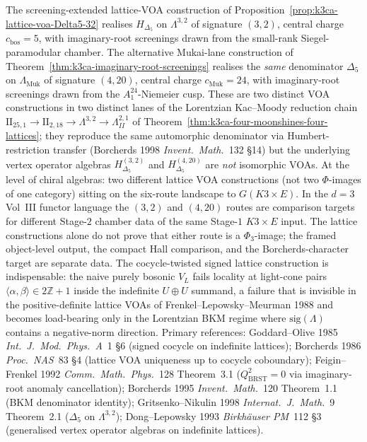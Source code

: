 \begin{remark}[Two lattice routes to \texorpdfstring{$\Delta_5$}{Delta-5}, neither subsumable; \texorpdfstring{$\Phi$}{Phi} at \texorpdfstring{$d=3$}{d=3}]
\label{rmk:k3ca-two-lattice-routes-Delta5}
The screening-extended lattice-VOA construction of
Proposition~\ref{prop:k3ca-lattice-voa-Delta5-32} realises
$H_{\Delta_5}$ on $\Lambda^{3,2}$ of signature $(3,2)$, central
charge $c_{\mathrm{bos}} = 5$, with imaginary-root screenings
drawn from the small-rank Siegel-paramodular chamber. The
alternative Mukai-lane construction of
Theorem~\ref{thm:k3ca-imaginary-root-screenings} realises the
\emph{same} denominator $\Delta_5$ on $\Lambda_{\mathrm{Muk}}$ of
signature $(4,20)$, central charge $c_{\mathrm{Muk}} = 24$, with
imaginary-root screenings drawn from the $A_1^{24}$-Niemeier cusp.
These are two distinct VOA constructions in two distinct lanes
of the Lorentzian Kac--Moody reduction chain
$\mathrm{II}_{25,1}\to\mathrm{II}_{2,18}\to\Lambda^{3,2}\to\Lambda^{2,1}_{II}$
of Theorem~\ref{thm:k3ca-four-moonshines-four-lattices}; they
reproduce the same automorphic denominator via Humbert-restriction
transfer (Borcherds 1998 \emph{Invent.\ Math.}~132 \S14) but the
underlying vertex operator algebras $H_{\Delta_5}^{(3,2)}$ and
$H_{\Delta_5}^{(4,20)}$ are \emph{not} isomorphic VOAs. At the level of
chiral algebras: two different
lattice VOA constructions (not two $\Phi$-images of one category)
sitting on the six-route landscape to $G(K3\times E)$.
In the $d=3$ Vol~III functor language the $(3,2)$ and $(4,20)$ routes
are comparison targets for different Stage-$2$ chamber data of the same
Stage-$1$ \(K3\times E\) input.  The lattice constructions alone do not
prove that either route is a \(\Phi_3\)-image; the framed
object-level output, the compact Hall comparison, and the
Borcherds-character target are separate data. The cocycle-twisted signed
lattice construction is indispensable: the naive purely bosonic
$V_L$ fails locality at light-cone pairs
$\langle\alpha,\beta\rangle\in 2\mathbb Z+1$ inside the indefinite
$U\oplus U$ summand, a failure that is invisible in the
positive-definite lattice VOAs of Frenkel--Lepowsky--Meurman 1988
and becomes load-bearing only in the Lorentzian BKM regime where
$\mathrm{sig}(\Lambda)$ contains a negative-norm direction.
Primary references: Goddard--Olive 1985
\emph{Int.\ J.\ Mod.\ Phys.\ A}~1 \S6 (signed cocycle on indefinite
lattices); Borcherds 1986 \emph{Proc.\ NAS}~83 \S4 (lattice VOA
uniqueness up to cocycle coboundary); Feigin--Frenkel 1992
\emph{Comm.\ Math.\ Phys.}~128 Theorem~3.1 ($Q_{\mathrm{BRST}}^2=0$
via imaginary-root anomaly cancellation); Borcherds 1995
\emph{Invent.\ Math.}~120 Theorem~1.1 (BKM denominator identity);
Gritsenko--Nikulin 1998 \emph{Internat.\ J.\ Math.}~9 Theorem~2.1
($\Delta_5$ on $\Lambda^{3,2}$); Dong--Lepowsky 1993
\emph{Birkh\"auser PM}~112 \S3 (generalised vertex operator
algebras on indefinite lattices).
\end{remark}

